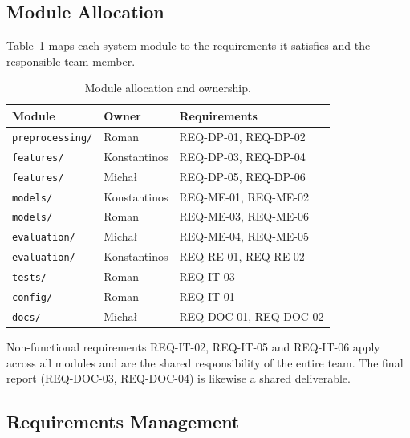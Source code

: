 \documentclass[runningheads]{llncs}
\begin{document}
\subsection{Module Allocation}

Table~\ref{tab:module-allocation} maps each system module to the requirements it satisfies and the responsible team member.

\begin{table}[h]
    \centering
    \begin{tabularx}{\textwidth}{llX}
        \toprule
        \textbf{Module}         & \textbf{Owner} & \textbf{Requirements}  \\
        \midrule
        \texttt{preprocessing/} & Roman          & REQ-DP-01, REQ-DP-02   \\
        \texttt{features/}      & Konstantinos   & REQ-DP-03, REQ-DP-04   \\
        \texttt{features/}      & Michał         & REQ-DP-05, REQ-DP-06   \\
        \texttt{models/}        & Konstantinos   & REQ-ME-01, REQ-ME-02   \\
        \texttt{models/}        & Roman          & REQ-ME-03, REQ-ME-06   \\
        \texttt{evaluation/}    & Michał         & REQ-ME-04, REQ-ME-05   \\
        \texttt{evaluation/}    & Konstantinos   & REQ-RE-01, REQ-RE-02   \\
        \texttt{tests/}         & Roman          & REQ-IT-03              \\
        \texttt{config/}        & Roman          & REQ-IT-01              \\
        \texttt{docs/}          & Michał         & REQ-DOC-01, REQ-DOC-02 \\
        \bottomrule
    \end{tabularx}
    \caption{Module allocation and ownership.}
    \label{tab:module-allocation}
\end{table}

\noindent Non-functional requirements REQ-IT-02, REQ-IT-05 and REQ-IT-06 apply across all modules and are the shared responsibility of the entire team. The final report (REQ-DOC-03, REQ-DOC-04) is likewise a shared deliverable.

\subsection{Requirements Management}
\end{document}
